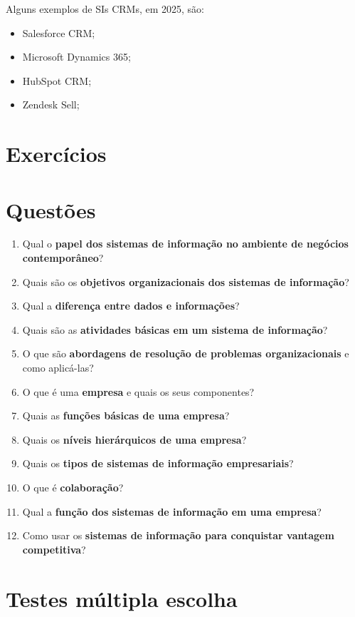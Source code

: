 \documentclass[
]{book}
\begin{document}
Alguns exemplos de SIs CRMs, em 2025, são:

\begin{itemize}
\item
  Salesforce CRM;
\item
  Microsoft Dynamics 365;
\item
  HubSpot CRM;
\item
  Zendesk Sell;
\end{itemize}

\section{Exercícios}\label{exercuxedcios}

\section{Questões}\label{questuxf5es}

\begin{enumerate}
\def\labelenumi{\arabic{enumi}.}
\item
  Qual o \textbf{papel dos sistemas de informação no ambiente de negócios contemporâneo}?
\item
  Quais são os \textbf{objetivos organizacionais dos sistemas de informação}?
\item
  Qual a \textbf{diferença entre dados e informações}?
\item
  Quais são as \textbf{atividades básicas em um sistema de informação}?
\item
  O que são \textbf{abordagens de resolução de problemas organizacionais} e como aplicá-las?
\item
  O que é uma \textbf{empresa} e quais os seus componentes?
\item
  Quais as \textbf{funções básicas de uma empresa}?
\item
  Quais os \textbf{níveis hierárquicos de uma empresa}?
\item
  Quais os \textbf{tipos de sistemas de informação empresariais}?
\item
  O que é \textbf{colaboração}?
\item
  Qual a \textbf{função dos sistemas de informação em uma empresa}?
\item
  Como usar os \textbf{sistemas de informação para conquistar vantagem competitiva}?
\end{enumerate}

\section{Testes múltipla escolha}\label{testes-muxfaltipla-escolha}
\end{document}
